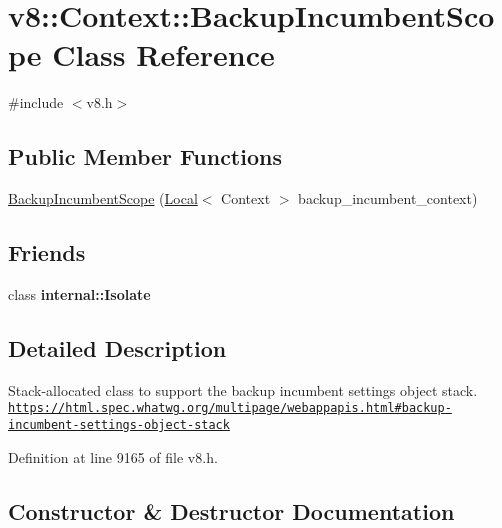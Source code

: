 \hypertarget{classv8_1_1Context_1_1BackupIncumbentScope}{}\section{v8\+:\+:Context\+:\+:Backup\+Incumbent\+Scope Class Reference}
\label{classv8_1_1Context_1_1BackupIncumbentScope}


{\ttfamily \#include $<$v8.\+h$>$}

\subsection*{Public Member Functions}
\begin{DoxyCompactItemize}
\item 
\mbox{\hyperlink{classv8_1_1Context_1_1BackupIncumbentScope_a0e5f36411216cdff0150156281b52d00}{Backup\+Incumbent\+Scope}} (\mbox{\hyperlink{classv8_1_1Local}{Local}}$<$ Context $>$ backup\+\_\+incumbent\+\_\+context)
\end{DoxyCompactItemize}
\subsection*{Friends}
\begin{DoxyCompactItemize}
\item 
\mbox{\label{classv8_1_1Context_1_1BackupIncumbentScope_a438c8b784134d31d7a50bc60098d8ba1}} 
class {\bfseries internal\+::\+Isolate}
\end{DoxyCompactItemize}


\subsection{Detailed Description}
Stack-\/allocated class to support the backup incumbent settings object stack. \href{https://html.spec.whatwg.org/multipage/webappapis.html#backup-incumbent-settings-object-stack}{\tt https\+://html.\+spec.\+whatwg.\+org/multipage/webappapis.\+html\#backup-\/incumbent-\/settings-\/object-\/stack} 

Definition at line 9165 of file v8.\+h.



\subsection{Constructor \& Destructor Documentation}
\mbox{\label{classv8_1_1Context_1_1BackupIncumbentScope_a0e5f36411216cdff0150156281b52d00}} 
